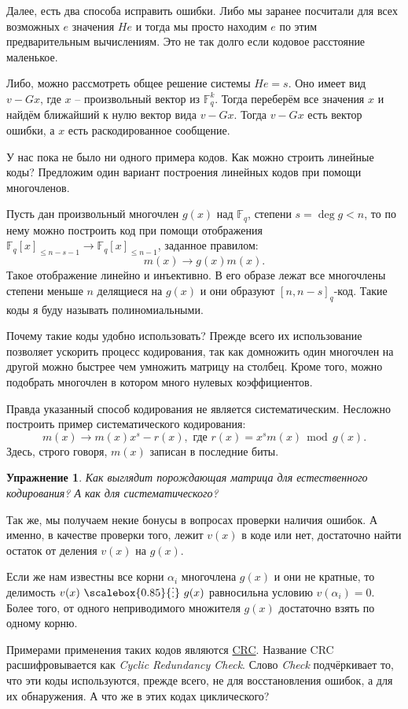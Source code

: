 \documentclass[12pt,a4paper,oneside]{book}
\newtheorem{uprz}{\color{violet!100!black} Упражнение}
\theoremstyle{definition}
\renewcommand{\leq}{\leqslant}
\renewcommand{\mod}{\,\operatorname{mod}\,}
\newcommand{\di}{\mathop{\,\scalebox{0.85}{\raisebox{-1.2pt}[0.5\height]{\vdots}}\,}}
\newcommand{\F}{\mathbb F}
\def\upr{\begin{uprz}}
\def\eupr{\end{uprz}}
\begin{document}
Далее, есть два способа исправить ошибки. Либо мы заранее посчитали для всех возможных $e$ значения $He$ и тогда мы просто находим $e$ по этим предварительным вычислениям. Это не так долго если кодовое расстояние маленькое. 

Либо, можно рассмотреть общее решение системы $He=s$. Оно имеет вид $v-Gx$, где $x$ -- произвольный вектор из $\F_q^k$. Тогда переберём все значения $x$ и найдём ближайший к нулю вектор вида $v-Gx$. Тогда $v-Gx$ есть вектор ошибки, а $x$ есть раскодированное сообщение.

У нас пока не было ни одного примера кодов. Как можно строить линейные коды? Предложим один вариант построения линейных кодов при помощи многочленов. 

Пусть дан произвольный многочлен $g(x)$ над $\F_q$, степени $s=\deg g < n$, то по нему можно построить код при помощи отображения $\F_q[x]_{\leq n-s-1} \to \F_q[x]_{\leq n-1}$, заданное правилом:
$$m(x) \to g(x)m(x).$$
Такое отображение линейно и инъективно. В его образе лежат все многочлены степени меньше $n$ делящиеся на $g(x)$ и они образуют $[n,n-s]_q$-код. Такие коды я буду называть полиномиальными. 

Почему такие коды удобно использовать? Прежде всего их использование позволяет ускорить процесс кодирования, так как домножить один многочлен на другой можно быстрее чем умножить матрицу на столбец. Кроме того, можно подобрать многочлен в котором много нулевых коэффициентов.

Правда указанный способ кодирования не является систематическим. Несложно построить пример систематического кодирования:
$$m(x) \to m(x)x^s-r(x), \text{ где } r(x)=x^s m(x) \mod g(x).$$
Здесь, строго говоря, $m(x)$ записан в последние биты.

\upr Как выглядит порождающая матрица для естественного кодирования? А как для систематического?
\eupr

Так же, мы получаем некие бонусы в вопросах проверки наличия ошибок. А именно, в качестве проверки того, лежит $v(x)$ в коде или нет, достаточно найти остаток от деления $v(x)$ на $g(x)$.   

Если же нам известны все корни $\alpha_i$ многочлена $g(x)$ и они не кратные, то делимость $v(x)\di g(x)$ равносильна условию $v(\alpha_i)=0$. Более того, от одного неприводимого множителя $g(x)$ достаточно взять по одному корню.

Примерами применения таких кодов являются \href{https://ru.wikipedia.org/wiki/%D0%A6%D0%B8%D0%BA%D0%BB%D0%B8%D1%87%D0%B5%D1%81%D0%BA%D0%B8%D0%B9_%D0%B8%D0%B7%D0%B1%D1%8B%D1%82%D0%BE%D1%87%D0%BD%D1%8B%D0%B9_%D0%BA%D0%BE%D0%B4}{CRC}.
Название CRC расшифровывается как {\it Cyclic Redundancy Check}. Слово {\it Check} подчёркивает то, что эти коды используются, прежде всего, не для восстановления ошибок, а для их обнаружения. А что же в этих кодах циклического?
\end{document}

